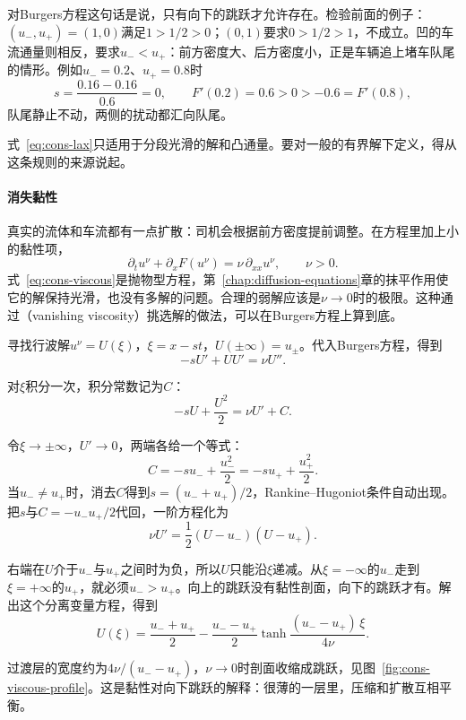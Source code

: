 对Burgers方程这句话是说，只有向下的跳跃才允许存在。检验前面的例子：$(u_-,u_+)=(1,0)$满足$1>1/2>0$；$(0,1)$要求$0>1/2>1$，不成立。凹的车流通量则相反，要求$u_-<u_+$：前方密度大、后方密度小，正是车辆追上堵车队尾的情形。例如$u_-=0.2$、$u_+=0.8$时
\[
  s=\frac{0.16-0.16}{0.6}=0,\qquad F'(0.2)=0.6>0>-0.6=F'(0.8),
\]
队尾静止不动，两侧的扰动都汇向队尾。

式~\eqref{eq:cons-lax}只适用于分段光滑的解和凸通量。要对一般的有界解下定义，得从这条规则的来源说起。

\paragraph{消失黏性}
真实的流体和车流都有一点扩散：司机会根据前方密度提前调整。在方程里加上小的黏性项，
\begin{equation}
  \partial_tu^{\nu}+\partial_xF(u^{\nu})=\nu\,\partial_{xx}u^{\nu},\qquad \nu>0.
  \label{eq:cons-viscous}
\end{equation}
式~\eqref{eq:cons-viscous}是抛物型方程，第~\ref{chap:diffusion-equations}章的抹平作用使它的解保持光滑，也没有多解的问题。合理的弱解应该是$\nu\to0$时的极限。这种通过（vanishing viscosity）挑选解的做法，可以在Burgers方程上算到底。

寻找行波解$u^{\nu}=U(\xi)$，$\xi=x-st$，$U(\pm\infty)=u_\pm$。代入Burgers方程，得到
\[
  -sU'+UU'=\nu U'' .
\]

对$\xi$积分一次，积分常数记为$C$：
\[
  -sU+\frac{U^2}{2}=\nu U'+C .
\]

令$\xi\to\pm\infty$，$U'\to0$，两端各给一个等式：
\[
  C=-su_-+\frac{u_-^2}{2}=-su_++\frac{u_+^2}{2}.
\]
当$u_-\neq u_+$时，消去$C$得到$s=(u_-+u_+)/2$，Rankine--Hugoniot条件自动出现。把$s$与$C=-u_-u_+/2$代回，一阶方程化为
\begin{equation}
  \nu U'=\frac12(U-u_-)(U-u_+).
  \label{eq:cons-viscous-profile}
\end{equation}

右端在$U$介于$u_-$与$u_+$之间时为负，所以$U$只能沿$\xi$递减。从$\xi=-\infty$的$u_-$走到$\xi=+\infty$的$u_+$，就必须$u_->u_+$。向上的跳跃没有黏性剖面，向下的跳跃才有。解出这个分离变量方程，得到
\begin{equation}
  U(\xi)=\frac{u_-+u_+}{2}-\frac{u_--u_+}{2}\tanh\frac{(u_--u_+)\,\xi}{4\nu}.
  \label{eq:cons-viscous-tanh}
\end{equation}

过渡层的宽度约为$4\nu/(u_--u_+)$，$\nu\to0$时剖面收缩成跳跃，见图~\ref{fig:cons-viscous-profile}。这是黏性对向下跳跃的解释：很薄的一层里，压缩和扩散互相平衡。

